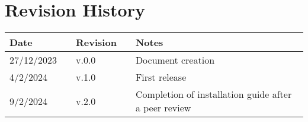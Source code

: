 \chapter*{Revision History}

\begin{table}[h]
    \centering
    \begin{tabular}{l p{2.5cm} l p{2.5cm} p{4cm}}
        \hline
        \textbf{Date} &  & \textbf{Revision} &  & \textbf{Notes}                                         \\ \hline
        27/12/2023    &  & v.0.0             &  & Document creation                                      \\
        4/2/2024      &  & v.1.0             &  & First release                                          \\
        9/2/2024      &  & v.2.0             &  & Completion of installation guide after a peer review   \\
        \hline
    \end{tabular}
\end{table}

\newpage